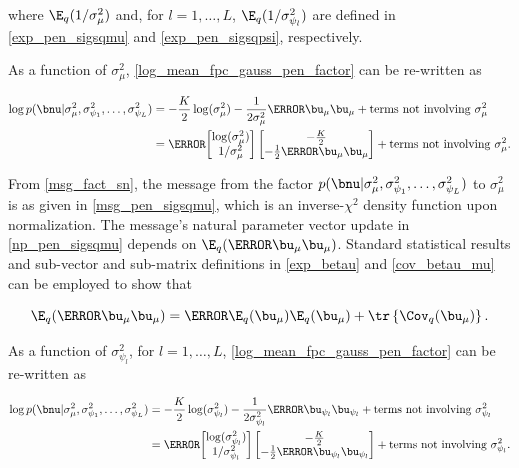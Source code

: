 \documentclass[12pt]{article}
\def\sigsqmu{\sigma^2_{\mu}}
\def\umu{\bu_\mu}
\newcommand\upsi[1]{\bu_{\psi_{#1}}}
\newcommand\sigsqpsi[1]{\sigma^2_{\psi_{#1}}}
\newcommand\tni[1]{\text{terms not involving $#1$}}
\theoremstyle{plain}
\theoremstyle{definition}
\theoremstyle{remark}
\begin{document}
\noindent where $\E_q (1/\sigsqmu)$ and, for $l = 1, \dots, L$, $\E_q (1/\sigsqpsi{l})$ are defined in
\eqref{exp_pen_sigsqmu} and \eqref{exp_pen_sigsqpsi}, respectively.

As a function of $\sigsqmu$, \eqref{log_mean_fpc_gauss_pen_factor} can be re-written as

\begin{align*}
	\log p(\bnu | \sigsqmu, \sigsqpsi{1}, \dots, \sigsqpsi{L})
		& = -\frac{K}{2} \log (\sigsqmu) - \frac{1}{2\sigsqmu} \T{\umu} \umu + \tni{\sigsqmu} \\
		& = \T{\begin{bmatrix}
			\log (\sigsqmu) \\
			1/\sigsqmu
		\end{bmatrix}} \begin{bmatrix}
			-\frac{K}{2} \\
			-\frac12 \T{\umu} \umu
		\end{bmatrix} + \tni{\sigsqmu}.
\end{align*}

\noindent From \eqref{msg_fact_sn}, the message from the factor $p(\bnu | \sigsqmu, \sigsqpsi{1}, \dots,
\sigsqpsi{L})$ to $\sigsqmu$ is as given in \eqref{msg_pen_sigsqmu}, which is an inverse-$\chi^2$
density function upon normalization. The message's natural parameter vector update in \eqref{np_pen_sigsqmu}
depends on $\E_q (\T{\umu} \umu)$. Standard statistical results and sub-vector and sub-matrix definitions in
\eqref{exp_betau} and \eqref{cov_betau_mu} can be employed to show that

\[
	\E_q (\T{\umu} \umu) = \T{\E_q (\umu)} \E_q (\umu) + \tr \left\{ \Cov_q (\umu) \right\}.
\]

As a function of $\sigsqpsi{l}$, for $l = 1, \dots, L$, \eqref{log_mean_fpc_gauss_pen_factor} can be re-written as

\begin{align*}
	\log p(\bnu | \sigsqmu, \sigsqpsi{1}, \dots, \sigsqpsi{L})
		& = -\frac{K}{2} \log (\sigsqpsi{l}) - \frac{1}{2\sigsqpsi{l}} \T{\upsi{l}} \upsi{l} + \tni{\sigsqpsi{l}} \\
		& = \T{\begin{bmatrix}
			\log (\sigsqpsi{l}) \\
			1/\sigsqpsi{l}
		\end{bmatrix}} \begin{bmatrix}
			-\frac{K}{2} \\
			-\frac12 \T{\upsi{l}} \upsi{l}
		\end{bmatrix} + \tni{\sigsqpsi{l}}.
\end{align*}
\end{document}
